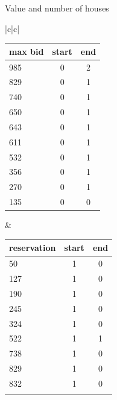 \begin{center}
Value and number of houses

\begin{tabular}{|c|c|}
 
\begin{tabular}{lcc}
max bid&start&end  \\ \hline
985  & 0 & 2 \\
829  & 0 & 1 \\
740  & 0 & 1 \\
650  & 0 & 1 \\
643  & 0 & 1 \\
611  & 0 & 1 \\\hline
532  & 0 & \color{red}1  \\
356  & 0 & \color{red} 1   \\
270  & 0 & \color{red} 1  \\
135  & 0 & 0    \\%
   
\end{tabular}

&
\begin{tabular}{lcc}
reservation&start&end \\ \hline
 50 & 1  & 0 \\
127 & 1  & 0 \\
190 & 1  & 0  \\
245 & 1  & 0 \\
 324 & 1  & 0 \\
 522 & 1 & \color{red} 1\\\hline
 738 & 1  &  \color{blue}0 \\
 829 &1  &  \color{blue}0 \\
832 & 1 & \color{blue}0\\
   &  &              \\%
\end{tabular}

\end{tabular}
\end{center}


